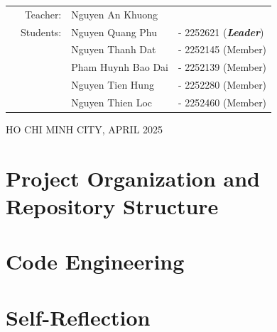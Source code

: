 \documentclass[openany]{mitthesis}
\theoremstyle{definition}
\begin{document}
\begin{titlepage}
\begin{table}[h]
\begin{tabular}{rrll}
\hspace{5 cm} & Teacher: & Nguyen An Khuong & \\
& Students: & Nguyen Quang Phu &- 2252621 (\textbf{\textit{Leader}})  \\
& & Nguyen Thanh Dat &- 2252145 (Member) \\
& & Pham Huynh Bao Dai &- 2252139 (Member) \\
& & Nguyen Tien Hung &- 2252280 (Member) \\
& & Nguyen Thien Loc &- 2252460 (Member) \\
\end{tabular}
\end{table}

\begin{center}
{\footnotesize HO CHI MINH CITY, APRIL 2025}
\end{center}
\restoregeometry
\end{titlepage}

\tableofcontents
\listoffigures
\listoftables

\pgfplotsset{compat=1.18}

%



\chapter{Project Organization and Repository Structure}
    

\chapter{Code Engineering}
    
    
    
    


\chapter{Self-Reflection}
    
    

% 
\end{document}

